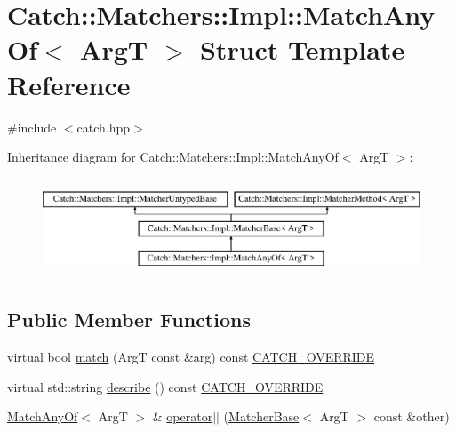 \hypertarget{structCatch_1_1Matchers_1_1Impl_1_1MatchAnyOf}{\section{Catch\-:\-:Matchers\-:\-:Impl\-:\-:Match\-Any\-Of$<$ Arg\-T $>$ Struct Template Reference}
\label{structCatch_1_1Matchers_1_1Impl_1_1MatchAnyOf}
}


{\ttfamily \#include $<$catch.\-hpp$>$}

Inheritance diagram for Catch\-:\-:Matchers\-:\-:Impl\-:\-:Match\-Any\-Of$<$ Arg\-T $>$\-:\begin{figure}[H]
\begin{center}
\leavevmode
\includegraphics[height=2.926829cm]{structCatch_1_1Matchers_1_1Impl_1_1MatchAnyOf}
\end{center}
\end{figure}
\subsection*{Public Member Functions}
\begin{DoxyCompactItemize}
\item 
virtual bool \hyperlink{structCatch_1_1Matchers_1_1Impl_1_1MatchAnyOf_a73be317ecf5919af855af96d68e714b9}{match} (Arg\-T const \&arg) const \hyperlink{catch_8hpp_a8ecdce4d3f57835f707915ae831eb847}{C\-A\-T\-C\-H\-\_\-\-O\-V\-E\-R\-R\-I\-D\-E}
\item 
virtual std\-::string \hyperlink{structCatch_1_1Matchers_1_1Impl_1_1MatchAnyOf_a020f5d7889d8cd8be9ad309c690147b6}{describe} () const \hyperlink{catch_8hpp_a8ecdce4d3f57835f707915ae831eb847}{C\-A\-T\-C\-H\-\_\-\-O\-V\-E\-R\-R\-I\-D\-E}
\item 
\hyperlink{structCatch_1_1Matchers_1_1Impl_1_1MatchAnyOf}{Match\-Any\-Of}$<$ Arg\-T $>$ \& \hyperlink{structCatch_1_1Matchers_1_1Impl_1_1MatchAnyOf_a44d7582dbe09fc31b9a5ba8a6367b506}{operator$\vert$$\vert$} (\hyperlink{structCatch_1_1Matchers_1_1Impl_1_1MatcherBase}{Matcher\-Base}$<$ Arg\-T $>$ const \&other)
\end{DoxyCompactItemize}
